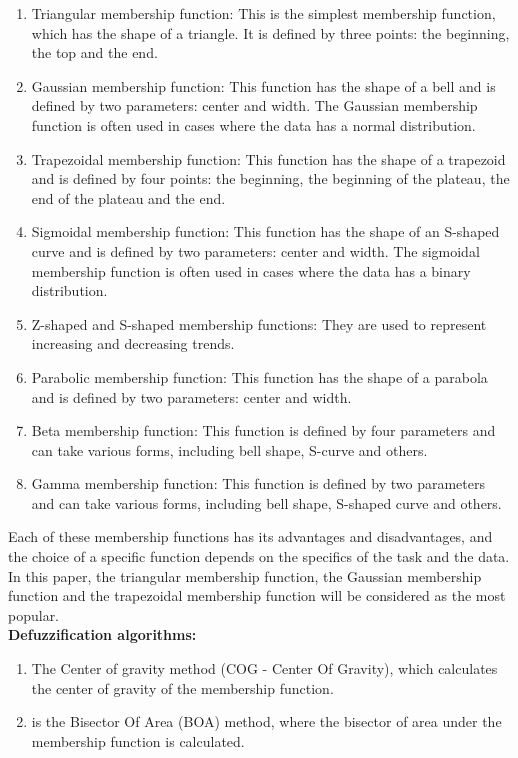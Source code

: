 \documentclass{article}
\begin{document}
\begin{minipage}{0.49\textwidth}
\begin{enumerate}
            \item Triangular membership function: This is the simplest membership function, which has the shape of a triangle. It is defined by three points: the beginning, the top and the end.
            \item Gaussian membership function: This function has the shape of a bell and is defined by two parameters: center and width. The Gaussian membership function is often used in cases where the data has a normal distribution.
            \item Trapezoidal membership function: This function has the shape of a trapezoid and is defined by four points: the beginning, the beginning of the plateau, the end of the plateau and the end.
            \item Sigmoidal membership function: This function has the shape of an S-shaped curve and is defined by two parameters: center and width. The sigmoidal membership function is often used in cases where the data has a binary distribution.
            \item Z-shaped and S-shaped membership functions: They are used to represent increasing and decreasing trends.
            \item Parabolic membership function: This function has the shape of a parabola and is defined by two parameters: center and width.
            \item Beta membership function: This function is defined by four parameters and can take various forms, including bell shape, S-curve and others.
            \item Gamma membership function: This function is defined by two parameters and can take various forms, including bell shape, S-shaped curve and others.
        \end{enumerate}
        Each of these membership functions has its advantages and disadvantages, and the choice of a specific function depends on the specifics of the task and the data. In this paper, the triangular membership function, the Gaussian membership function and the trapezoidal membership function will be considered as the most popular.\\
        \textbf{Defuzzification algorithms:}
        \begin{enumerate}
            \item The Center of gravity method (COG - Center Of Gravity), which calculates the center of gravity of the membership function.
            \item is the Bisector Of Area (BOA) method, where the bisector of area under the membership function is calculated.

\end{enumerate}
\end{minipage}
\end{document}
